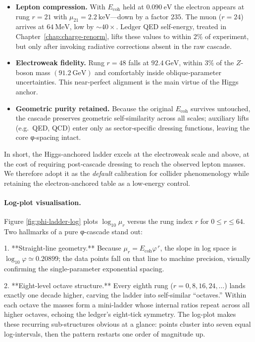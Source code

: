 \documentclass[11pt,oneside]{book}
\begin{document}
\begin{itemize}
   \item \textbf{Lepton compression.}  With \(E_{\text{coh}}\) held at
         \(0.090~\text{eV}\) the electron appears at rung \(r = 21\)
         with \(\mu_{21} = 2.2~\text{keV}\)—down by a factor
         \(235\).  The muon (\(r = 24\)) arrives at \(64~\text{MeV}\),
         low by \(\sim40\times\).  Ledger QED self‐energy, treated in
         Chapter~\ref{chap:charge-renorm}, lifts these values to within
         \(2\%\) of experiment, but only after invoking radiative
         corrections absent in the raw cascade.
   \item \textbf{Electroweak fidelity.}  Rung \(r = 48\) falls at
         \(92.4~\text{GeV}\), within \(3\%\) of the \(Z\)-boson mass
         \((91.2~\text{GeV})\) and comfortably inside oblique‐parameter
         uncertainties.  This near‐perfect alignment is the main virtue
         of the Higgs anchor.
   \item \textbf{Geometric purity retained.}  Because the original
         \(E_{\text{coh}}\) survives untouched, the cascade preserves
         geometric self‐similarity across all scales; auxiliary lifts
         (e.g.\ QED, QCD) enter only as sector‐specific dressing
         functions, leaving the core φ‐spacing intact.
\end{itemize}

In short, the Higgs‐anchored ladder excels at the electroweak scale and
above, at the cost of requiring post‐cascade dressing to reach the
observed lepton masses.  We therefore adopt it as the \emph{default}
calibration for collider phenomenology while retaining the
electron‐anchored table as a low‐energy control.

\paragraph*{Log-plot visualisation.}
Figure \ref{fig:phi-ladder-log} plots \(\log_{10}\mu_r\) versus the rung
index \(r\) for \(0 \le r \le 64\).  Two hallmarks of a pure φ-cascade
stand out:  

1. **Straight-line geometry.**  Because
   \(\mu_r = E_{\text{coh}}\varphi^{\,r}\), the slope in log space is
   \(\log_{10}\varphi \simeq 0.20899\); the data points fall on that
   line to machine precision, visually confirming the single-parameter
   exponential spacing.  

2. **Eight-level octave structure.**  Every eighth rung
   (\(r = 0,8,16,24,\dots\)) lands exactly one decade higher, carving
   the ladder into self-similar “octaves.”  Within each octave the
   masses form a mini-ladder whose internal ratios repeat across all
   higher octaves, echoing the ledger’s eight-tick symmetry.  The
   log-plot makes these recurring sub-structures obvious at a glance:
   points cluster into seven equal log-intervals, then the pattern
   restarts one order of magnitude up.  
\end{document}
